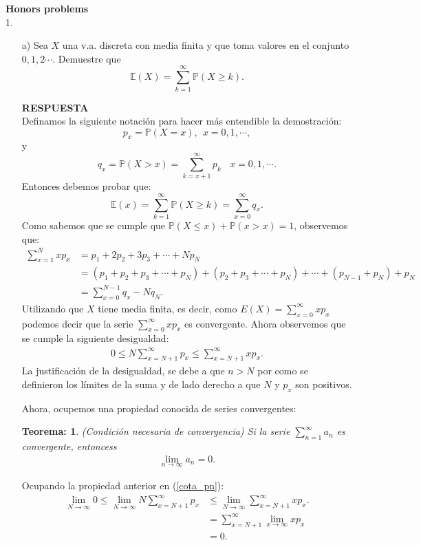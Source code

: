 \documentclass[11pt,letterpaper]{article}
\newcommand{\mP}{\mathbb{P}}
\newcommand{\mE}{\mathbb{E}}
\newcommand{\res}{\textbf{RESPUESTA}\\}
\newtheorem{thm}{Teorema:}
\begin{document}
\textbf{Honors problems} \\
1. \begin{itemize}
\item[a)] Sea $X$ una v.a. discreta con media finita y que toma valores en el conjunto $0,1,2\cdots .$ Demuestre que 
$$\mE(X)=\sum_{k=1}^\infty \mP(X\geq k).$$

\res Definamos la siguiente notación para hacer más entendible la demostración: $$p_x=\mP(X=x), \ \ x=0,1,\cdots,$$ y $$q_x=\mP(X> x)=\sum_{k=x+1}^\infty p_k \ \ \ \ x=0,1,\cdots.$$
Entonces debemos probar que:
$$\mE(x)=\sum_{k=1}^\infty \mP(X\geq k)=\sum_{x=0}^\infty q_x.$$
Como sabemos que se cumple que $\mP(X\leq x) +\mP(x>x)=1$, observemos que:
\begin{align*}
\sum_{x=1}^Nxp_x&=p_1+2p_2+3p_3+\cdots+Np_N\\
&=(p_1+p_2+p_3+\cdots+p_N)+(p_2+p_3+\cdots+p_N)+\cdots+(p_{N-1}+p_N)+p_N\\
&=\sum_{x=0}^{N-1} q_x-Nq_N.
\end{align*}
Utilizando que $X$ tiene media finita, es decir, como $E(X)=\sum_{x=0}^\infty xp_x$ podemos decir que la serie $\sum_{x=0}^\infty xp_x$ es convergente. Ahora observemos que se cumple la siguiente desigualdad:
\begin{align}
\label{cota_pn}
0 \leq N\sum_{x=N+1}^\infty p_x \leq \sum_{x=N+1}^\infty x p_x.
\end{align} 
La justificación de la desigualdad, se debe a que $n>N$ por como se definieron los límites de la suma y de lado derecho a que $N$ y $p_x$ son positivos. 

Ahora, ocupemos una propiedad conocida de series convergentes: 
\begin{framed}
    \begin{thm} (Condición necesaria de convergencia) Si la serie $\sum_{n=1}^\infty a_n$ es convergente, entoncess 
        \begin{align*}
        \lim_{n\rightarrow  \infty} a_n=0.
        \end{align*}
    \end{thm}
\end{framed} 
Ocupando la propiedad anterior en (\ref{cota_pn}):
\begin{align*}
\lim_{N\rightarrow\infty } 0 \leq \lim_{N\rightarrow\infty } N \sum_{x=N+1}^\infty p_x &\leq \lim_{N\rightarrow\infty } \sum_{x=N+1}^\infty x p_x.\\
&=\sum_{x=N+1}^\infty \lim_{x\rightarrow\infty }x p_x\\
&=0.
\end{align*} 





\end{itemize}
\end{document}
